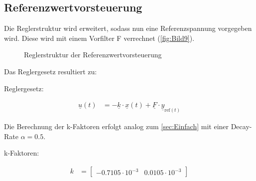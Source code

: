 \clearpage

\subsection{Referenzwertvorsteuerung} \label{sec:Referenzwertvorsteuerung}

Die Reglerstruktur wird erweitert, sodass nun eine Referenzspannung vorgegeben wird. Diese wird mit einem Vorfilter F verrechnet (\autoref{fig:Bild9}).

\begin{figure}[H]
   \centering
   \caption[Reglerstruktur der Referenzwertvorsteuerung]{Reglerstruktur der Referenzwertvorsteuerung}
   \label{fig:Bild9}
\end{figure}

Das Reglergesetz resultiert zu:\\
\newline

Reglergesetz:

\begin{align}
    \underline{u}(t) &= -\underline{k}\cdot\underline{x}(t)+\underline{F}\cdot\underline{y}_{\mathrm{ref}(t)}
    \label{eq:Gleichung22}
\end{align}

Die Berechnung der k-Faktoren erfolgt analog zum \autoref{sec:Einfach} mit einer Decay-Rate $\alpha = 0.5$.\\
\newline

k-Faktoren:

\begin{align}
    k &= 
    \begin{bmatrix}
        -0.7105\cdot 10^{-3} & 0.0105\cdot 10^{-3}
    \end{bmatrix}
    \label{eq:Gleichung23}
\end{align}

